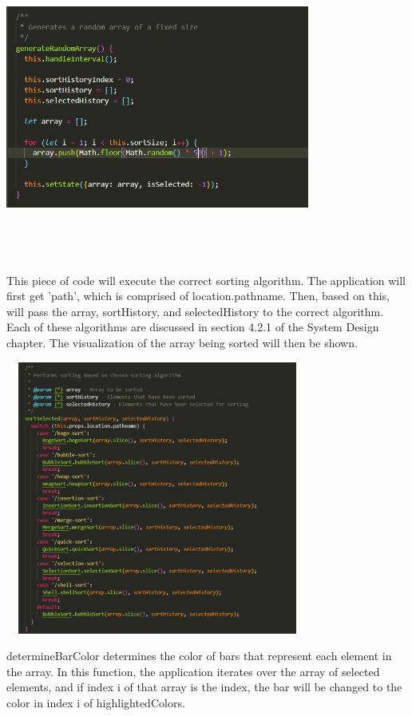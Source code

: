 \newpage
\begin{center}
    \includegraphics[width=10cm,height=10cm,keepaspectratio]{images/mainpage5}
\end{center}
This piece of code will execute the correct sorting algorithm. The application will first get 'path', which is comprised of location.pathname. Then, based on this, will pass the array, sortHistory, and selectedHistory to the correct algorithm. Each of these algorithms are discussed in section 4.2.1 of the System Design chapter. The visualization of the array being sorted will then be shown.

\begin{center}
    \includegraphics[width=10cm,height=9cm,keepaspectratio]{images/mainpage6}
\end{center}
determineBarColor determines the color of bars that represent each element in the array. In this function, the application iterates over the array of selected elements, and if index i of that array is the index, the bar will be changed to the color in index i of highlightedColors.

